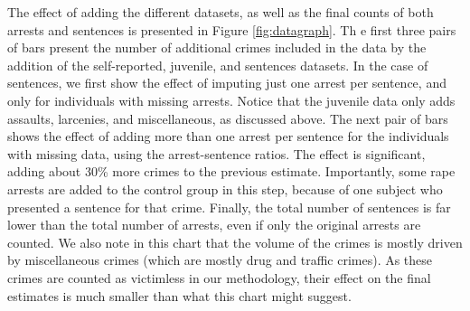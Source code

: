 \noindent The effect of adding the different datasets, as well as the final counts of both arrests and sentences is presented in Figure \ref{fig:datagraph}. Th e first three pairs of bars present the number of additional crimes included in the data by the addition of the self-reported, juvenile, and sentences datasets. In the case of sentences, we first show the effect of imputing just one arrest per sentence, and only for individuals with missing arrests. Notice that the juvenile data only adds assaults, larcenies, and miscellaneous, as discussed above. The next pair of bars shows the effect of adding more than one arrest per sentence for the individuals with missing data, using the arrest-sentence ratios. The effect is significant, adding about 30\% more crimes to the previous estimate. Importantly, some rape arrests are added to the control group in this step, because of one subject who presented a sentence for that crime. Finally, the total number of sentences is far lower than the total number of arrests, even if only the original arrests are counted. We also note in this chart that the volume of the crimes is mostly driven by miscellaneous crimes (which are mostly drug and traffic crimes). As these crimes are counted as victimless in our methodology, their effect on the final estimates is much smaller than what this chart might suggest. \\

